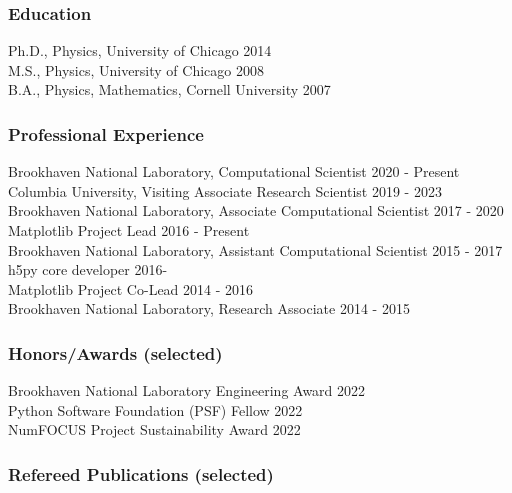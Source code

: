 \documentclass[12pt]{article}
\numberwithin{page}{section}
\begin{document}
\subsubsection*{Education}
Ph.D., Physics, University of Chicago \hfill 2014\\
M.S., Physics, University of Chicago \hfill 2008\\
B.A., Physics, Mathematics, Cornell University \hfill 2007

\subsubsection*{Professional Experience}
Brookhaven National Laboratory, Computational Scientist \hfill 2020 - Present\\
Columbia University, Visiting Associate Research Scientist \hfill 2019 - 2023 \\
Brookhaven National Laboratory, Associate Computational Scientist \hfill 2017 - 2020\\
Matplotlib Project Lead \hfill 2016 - Present\\
Brookhaven National Laboratory, Assistant Computational Scientist \hfill 2015 - 2017\\
h5py core developer \hfill 2016-\\
Matplotlib Project Co-Lead \hfill 2014 - 2016\\
Brookhaven National Laboratory, Research Associate \hfill 2014 - 2015\\

\subsubsection*{Honors/Awards (selected)}
Brookhaven National Laboratory Engineering Award \hfill 2022\\
Python Software Foundation (PSF) Fellow \hfill 2022\\
NumFOCUS Project Sustainability Award \hfill 2022

\subsubsection*{Refereed Publications (selected)}
\end{document}
